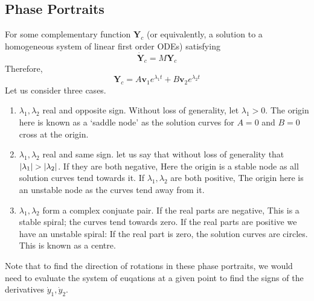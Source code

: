 \documentclass{article}
\begin{document}
	\subsection{Phase Portraits}
	For some complementary function $\bm Y_c$ (or equivalently, a solution to a homogeneous system of linear first order ODEs) satisfying
	\begin{equation}\label{phasematrix}
		\dot {\bm Y}_c = M\bm Y_c
	\end{equation}
	Therefore,
	\[ \bm Y_c = A\bm v_1 e^{\lambda_1 t} + B\bm v_2 e^{\lambda_2 t} \]
	Let us consider three cases.
	\begin{enumerate}
		\item $\lambda_1, \lambda_2$ real and opposite sign. Without loss of generality, let $\lambda_1 > 0$. %
		The origin here is known as a `saddle node' as the solution curves for $A=0$ and $B=0$ cross at the origin.
		\item $\lambda_1, \lambda_2$ real and same sign. let us say that without loss of generality that $\abs{\lambda_1} > \abs{\lambda_2}$. If they are both negative, %
		Here the origin is a stable node as all solution curves tend towards it. If $\lambda_1, \lambda_2$ are both positive, %
		The origin here is an unstable node as the curves tend away from it.
		\item $\lambda_1, \lambda_2$ form a complex conjuate pair. If the real parts are negative, %
		This is a stable spiral; the curves tend towards zero. If the real parts are positive we have an unstable spiral:
		If the real part is zero, the solution curves are circles. This is known as a centre. %
	\end{enumerate}
	Note that to find the direction of rotations in these phase portraits, we would need to evaluate the system of euqations at a given point to find the signs of the derivatives $\dot y_1, \dot y_2$.
\end{document}

